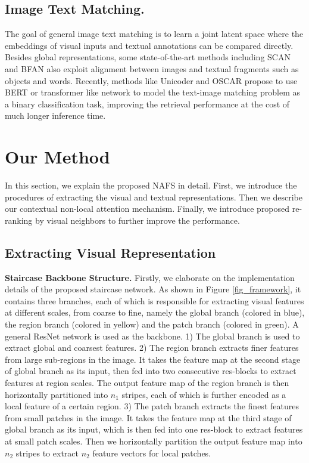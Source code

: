 \documentclass[final]{cvpr}
\begin{document}
\subsection{Image Text Matching.}
The goal of general image text matching is to learn a joint latent space where the embeddings of visual inputs and textual annotations can be compared directly. 
Besides global representations, some state-of-the-art methods including  SCAN \cite{lee2018stacked} and BFAN \cite{liu2019focus} also exploit alignment between images and textual fragments such as objects and words. Recently, methods like Unicoder and OSCAR \cite{li2020unicoder,li2020oscar} propose to use BERT \cite{devlin2018bert} or transformer \cite{vaswani2017attention} like network to model the text-image matching problem as a binary classification task, improving the retrieval performance at the cost of much longer inference time. 

\section{Our Method} 
In this section, we explain the proposed NAFS in detail. First, we introduce the procedures of extracting the visual and textual representations. Then we describe our contextual non-local attention mechanism. Finally, we introduce proposed re-ranking by visual neighbors to further improve the performance.
\subsection{Extracting Visual Representation}
\textbf{Staircase Backbone Structure.} Firstly, we elaborate on the implementation details of the proposed staircase network. As shown in Figure \ref{fig_framework}, 
it contains three branches, each of which is responsible for extracting visual features at different scales, from coarse to fine, namely the global branch (colored in blue), the region branch (colored in yellow) and the patch branch (colored in green). A general ResNet \cite{he2016deep} network is used as the backbone. 
1) The global branch is used to extract global and coarsest features. 
2) The region branch extracts finer features from large sub-regions in the image. It takes the feature map at the second stage of global branch as its input, then fed into two consecutive res-blocks to extract features at region scales. The output feature map of the region branch is then horizontally partitioned into $n_1$ stripes, each of which is further encoded as a local feature of a certain region. 
3) The patch branch extracts the finest features from small patches in the image. It takes the feature map at the third stage of global branch as its input, which is then fed into one res-block to extract features at small patch scales. Then we horizontally partition the output feature map into $n_2$  stripes to extract $n_2$ feature vectors for local patches.
\end{document}
